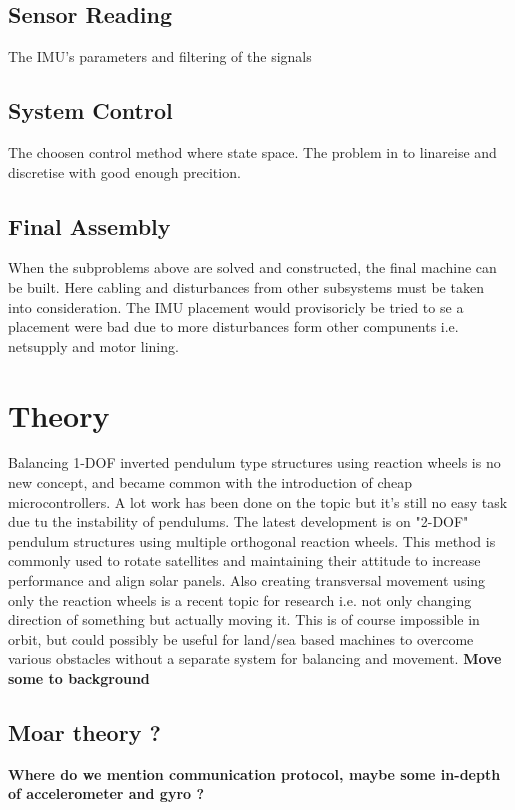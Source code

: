 \documentclass[a4paper,11pt]{kth-mag}
\begin{document}
\section{Sensor Reading}
The IMU's parameters and filtering of the signals

\section{System Control}
The choosen control method where state space. The problem in to linareise and discretise with good enough precition.

\section{Final Assembly}
When the subproblems above are solved and constructed, the final machine can be built. Here cabling and disturbances from other subsystems must be taken into consideration. 
The IMU placement would provisoricly be tried to se a placement were bad due to more disturbances form other compunents i.e. netsupply and motor lining.

\chapter{Theory}
Balancing 1-DOF inverted pendulum type structures using reaction wheels is no new concept, and became common with the introduction of cheap microcontrollers. A lot work has been done on the topic but it's still no easy task due tu the instability of pendulums. The latest development is on "2-DOF" pendulum structures using multiple orthogonal reaction wheels. This method is commonly used to rotate satellites and maintaining their attitude to increase performance and align solar panels. 
Also creating transversal movement using only the reaction wheels is a recent topic for research i.e. not only changing direction of something but actually moving it. This is of course impossible in orbit, but could possibly be useful for land/sea based machines to overcome various obstacles without a separate system for balancing and movement. \textbf{Move some to background}

\section{Moar theory ?}
\textbf{Where do we mention communication protocol, maybe some in-depth of accelerometer and gyro ? }
\end{document}
